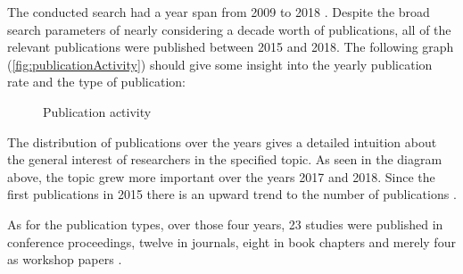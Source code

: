 The conducted search had a year span from 2009 to 2018 \cite{waseem:SMSMSADevOps}.
Despite the broad search parameters of nearly considering a decade worth
of publications, all of the relevant publications were published between
2015 and 2018. The following graph (\autoref{fig:publicationActivity})
should give some insight into the yearly publication rate and the type of publication:

\begin{figure}[H]
    \caption{Publication activity}
    \label{fig:publicationActivity}
\end{figure}

The distribution of publications over the years gives a detailed intuition
about the general interest of researchers in the specified topic. As seen
in the diagram above, the topic grew more important over the years 2017 and
2018. Since the first publications in 2015 there is an upward trend to
the number of publications \cite{waseem:SMSMSADevOps}.

As for the publication types, over those four years, 23 studies
were published in conference proceedings, twelve in journals, eight in book chapters
and merely four as workshop papers \cite{waseem:SMSMSADevOps}.

